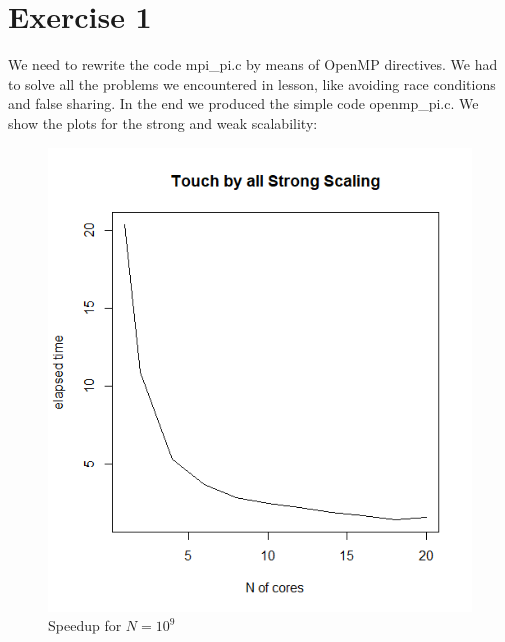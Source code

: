 \documentclass{article}
\begin{document}
\section{Exercise 1}

We need to rewrite the code mpi\_pi.c by means of OpenMP directives. We had to solve all the problems we encountered in lesson, like avoiding race conditions and false sharing.
In the end we produced the simple code openmp\_pi.c.
We show the plots for the strong and weak scalability:


\begin{figure}[H] %
	\centering
	\includegraphics[width=0.8\columnwidth]{graphs/openmp_pi_strongscaling} %
	\caption{Speedup for $N=10^9$}
\end{figure}
\end{document}
